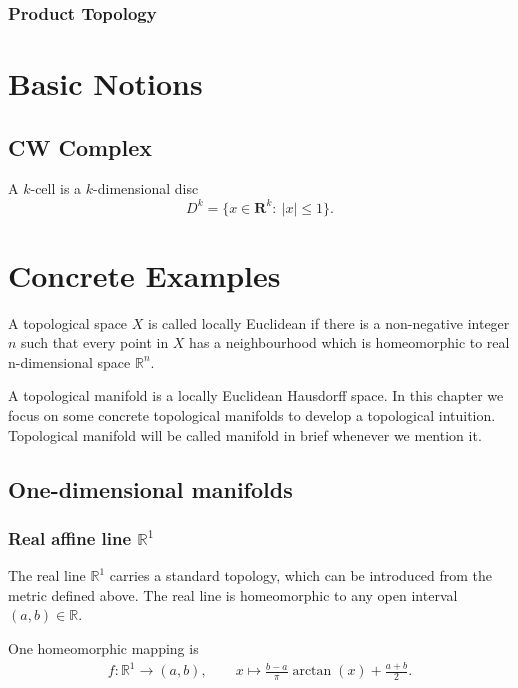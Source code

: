\documentclass{report}
\theoremstyle{nonumberplain}
\begin{document}
\subsection{Product Topology}


\chapter{Basic Notions}
\section{CW Complex}
A $k$-cell is a $k$-dimensional disc
\[
D^k=\{x\in\mathbf{R}^k:\ |x|\leq 1\}.
\]

\chapter{Concrete Examples}
A topological space $X$ is called locally Euclidean if there is a non-negative integer $n$ such that every point in $X$ has a neighbourhood which is homeomorphic to real n-dimensional space $\mathbb{R}^n$.

\indent A topological manifold is a locally Euclidean Hausdorff space. In this chapter we focus on some concrete topological manifolds to develop a topological intuition. Topological manifold will be called manifold in brief whenever we mention it.

\section{One-dimensional manifolds}
\subsection{Real affine line $\mathbb{R}^1$}
The real line $\mathbb{R}^1$ carries a standard topology, which can be introduced from the metric defined above. The real line is homeomorphic to any open interval $(a, b)\in\mathbb{R}$.
\begin{center}
\end{center}
One homeomorphic mapping is
\begin{align*}
	f:\mathbb{R}^1\longrightarrow(a, b),\qquad
	 x\longmapsto \frac{b-a}{\pi}\arctan\left(x\right)+\frac{a+b}{2}.
\end{align*}
\end{document}
